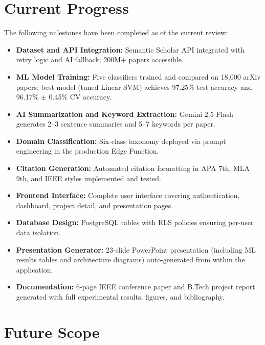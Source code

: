\documentclass[12pt,a4paper]{article}
\begin{document}
\section{Current Progress}

The following milestones have been completed as of the current review:

\begin{itemize}[leftmargin=1.5cm]
  \item \textbf{Dataset and API Integration:} Semantic Scholar API integrated with retry logic and AI fallback; 200M+ papers accessible.
  \item \textbf{ML Model Training:} Five classifiers trained and compared on 18,000 arXiv papers; best model (tuned Linear SVM) achieves 97.25\% test accuracy and 96.17\% $\pm$ 0.45\% CV accuracy.
  \item \textbf{AI Summarization and Keyword Extraction:} Gemini 2.5 Flash generates 2--3 sentence summaries and 5--7 keywords per paper.
  \item \textbf{Domain Classification:} Six-class taxonomy deployed via prompt engineering in the production Edge Function.
  \item \textbf{Citation Generation:} Automated citation formatting in APA 7th, MLA 9th, and IEEE styles implemented and tested.
  \item \textbf{Frontend Interface:} Complete user interface covering authentication, dashboard, project detail, and presentation pages.
  \item \textbf{Database Design:} PostgreSQL tables with RLS policies ensuring per-user data isolation.
  \item \textbf{Presentation Generator:} 23-slide PowerPoint presentation (including ML results tables and architecture diagrams) auto-generated from within the application.
  \item \textbf{Documentation:} 6-page IEEE conference paper and B.Tech project report generated with full experimental results, figures, and bibliography.
\end{itemize}

\section{Future Scope}
\end{document}
